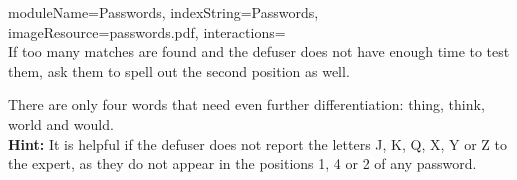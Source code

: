 \documentclass{../../ktane-mod}
\begin{document}
\begin{module}{
  moduleName=Passwords,
  indexString=Passwords,
  imageResource=passwords.pdf,
  interactions=\keysymbol
}
  \medskip\\
  If too many matches are found and the defuser does not have enough time to test them, ask them to spell out the second position as well.

  There are only four words that need even further differentiation: thing, think, world and would.\bigskip\\

  \textbf{Hint:} It is helpful if the defuser does not report the letters J, K, Q, X, Y or Z to the expert, as they do not appear in the positions 1, 4 or 2 of any password.
\end{module}
\end{document}

